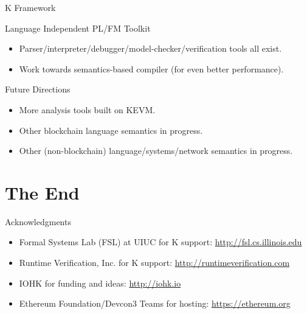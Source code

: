 \documentclass[8pt,ignorenonframetext,]{beamer}
\providecommand{\tightlist}{%
  \setlength{\itemsep}{0pt}\setlength{\parskip}{0pt}}
\begin{document}
\begin{frame}{K Framework}

\begin{block}{Language Independent PL/FM Toolkit}

\begin{itemize}
\tightlist
\item
  Parser/interpreter/debugger/model-checker/verification tools all
  exist.
\item
  Work towards semantics-based compiler (for even better performance).
\end{itemize}

\end{block}

\begin{block}{Future Directions}

\begin{itemize}
\tightlist
\item
  More analysis tools built on KEVM.
\item
  Other blockchain language semantics in progress.
\item
  Other (non-blockchain) language/systems/network semantics in progress.
\end{itemize}

\end{block}

\end{frame}

\section{The End}\label{the-end}

\begin{frame}{Acknowledgments}

\begin{itemize}
\tightlist
\item
  Formal Systems Lab (FSL) at UIUC for K support:
  \url{http://fsl.cs.illinois.edu}
\item
  Runtime Verification, Inc. for K support:
  \url{http://runtimeverification.com}
\item
  IOHK for funding and ideas: \url{http://iohk.io}
\item
  Ethereum Foundation/Devcon3 Teams for hosting:
  \url{https://ethereum.org}
\end{itemize}

\end{frame}
\end{document}
